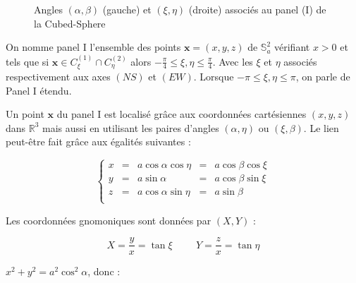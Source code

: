 \begin{figure}
\begin{center}
\caption{Angles $(\alpha, \beta)$ (gauche) et $(\xi,\eta)$ (droite) associés au panel (I) de la Cubed-Sphere}
\label{fig:coord cs}
\end{center}
\end{figure}


\begin{definition}
On nomme panel I l'ensemble des points $\mathbf{x}=(x,y,z)$ de $\mathbb{S}_a^2$ vérifiant $x>0$ et tels que si $\mathbf{x} \in C_{\xi}^{(1)} \cap C_{\eta}^{(2)}$ alors $-\frac{\pi}{4}\leq \xi,\eta \leq \frac{\pi}{4}$. Avec les $\xi$ et $\eta$ associés respectivement aux axes $(NS)$ et $(EW)$. Lorsque $-\pi \leq \xi,\eta \leq \pi$, on parle de Panel I étendu.
\end{definition}

Un point $\mathbf{x}$ du panel I est localisé grâce aux coordonnées cartésiennes $(x,y,z)$ dans $\mathbb{R}^3$ mais aussi en utilisant les paires d'angles $(\alpha, \eta)$ ou $(\xi, \beta)$. Le lien peut-être fait grâce aux égalités suivantes :

\begin{equation}
\left\lbrace
\begin{array}{rcccc}
x & = & a \cos \alpha \cos \eta & = & a \cos \beta \cos \xi \\
y & = & a \sin \alpha & = & a \cos \beta \sin \xi \\
z & = & a \cos \alpha \sin \eta & = & a \sin \beta \\
\end{array}
\right.
\end{equation}

Les coordonnées gnomoniques sont données par $(X,Y)$ :

\begin{equation}
X=\dfrac{y}{x}=\tan \xi \hspace{1cm} Y = \dfrac{z}{x} = \tan \eta
\end{equation}

$x^2+y^2=a^2 \cos^2 \alpha$, donc :

